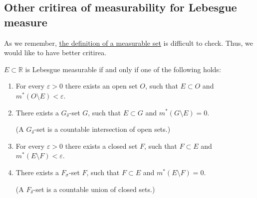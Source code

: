 \pagebreak
\subsection{Other critirea of measurability for Lebesgue measure}
As we remember, \hyperref[def:measurable]{the definition
of a measurable set} is difficult to check. Thus, we would like to have
better critirea.
\begin{theorem}
    \label{the:lebesgueMeasurableConditions}
    $E \subset \mathbb{R}$ is Lebesgue measurable if and only if one of the following holds:
    \begin{enumerate}
        \item {
            For every $\varepsilon > 0$ there exists an open set $O$, such that
            $E \subset O$ and $m^*(O \setminus E) < \varepsilon$.
        }
        \item {
            There exists a $G_\delta$-set $G$, such that $E \subset G$ 
            and $m^*(G \setminus E) = 0$.

            (A $G_\delta$-set is a countable intersection of open sets.)
        }
        \item {
            For every $\varepsilon > 0$ there exists a closed set $F$, such that
            $F \subset E$ and $m^*(E \setminus F) < \varepsilon$.
        }
        \item {
            There exists a $F_\sigma$-set $F$, such that $F \subset E$
            and $m^*(E \setminus F) = 0$.

            (A $F_\delta$-set is a countable union of closed sets.)
        }
    \end{enumerate}
\end{theorem}
